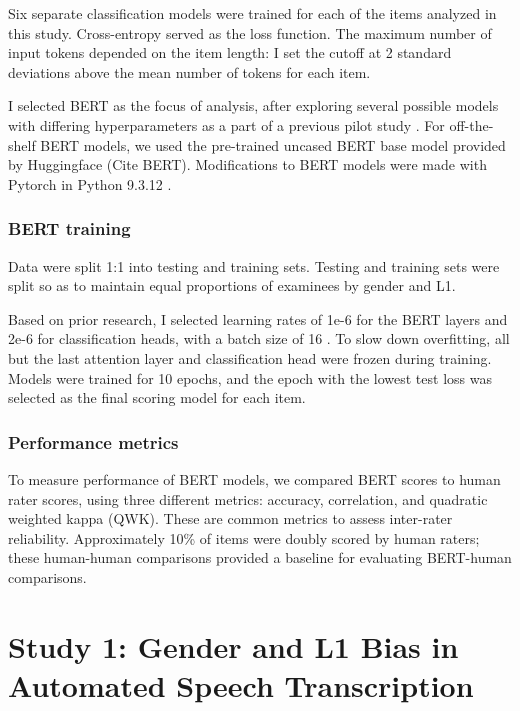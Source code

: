\documentclass [PhD] {uclathes}
\begin{document}
Six separate classification models were trained for each of the items analyzed in this study. Cross-entropy served as the loss function. The maximum number of input tokens depended on the item length: I set the cutoff at 2 standard deviations above the mean number of tokens for each item. 

I selected BERT as the focus of analysis, after exploring several possible models with differing hyperparameters as a part of a previous pilot study \citep{kwako2022using}. For off-the-shelf BERT models, we used the pre-trained uncased BERT base model provided by Huggingface \citep{wolf_transformers_2020} (Cite BERT). Modifications to BERT models were made with Pytorch \citep{paszke_pytorch_2019} in Python 9.3.12 \citep{python2022}. 

\subsection{BERT training}

Data were split 1:1 into testing and training sets. Testing and training sets were split so as to maintain equal proportions of examinees by gender and L1. 

Based on prior research, I selected learning rates of 1e-6 for the BERT layers and 2e-6 for classification heads, with a batch size of 16 \citep{kwako2022using}. To slow down overfitting, all but the last attention layer and classification head were frozen during training. Models were trained for 10 epochs, and the epoch with the lowest test loss was selected as the final scoring model for each item. 

\subsection{Performance metrics}

To measure performance of BERT models, we compared BERT scores to human rater scores, using three different metrics: accuracy, correlation, and quadratic weighted kappa (QWK). These are common metrics to assess inter-rater reliability. Approximately 10\% of items were doubly scored by human raters; these human-human comparisons provided a baseline for evaluating BERT-human comparisons.



\chapter{Study 1: Gender and L1 Bias in Automated Speech Transcription}
\end{document}
